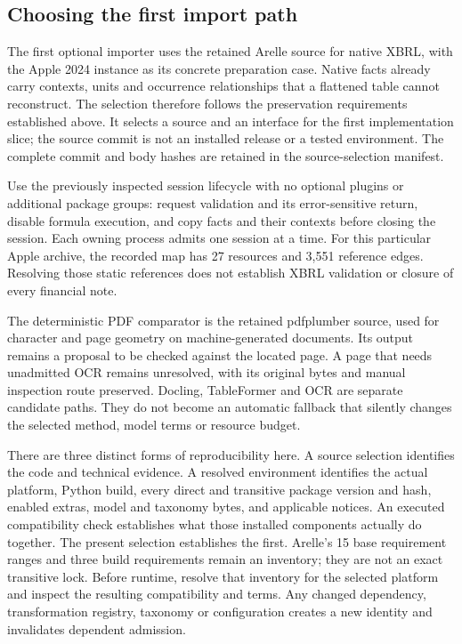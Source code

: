 \hypertarget{choosing-the-first-import-path}{%
\subsection{Choosing the first import path}\label{choosing-the-first-import-path}}

The first optional importer uses the retained Arelle source \mbox{\citep{arellepinned2026}} for native XBRL, with the Apple 2024 instance as its concrete preparation case. Native facts already carry contexts, units and occurrence relationships that a flattened table cannot reconstruct. The selection therefore follows the preservation requirements established above. It selects a source and an interface for the first implementation slice; the source commit is not an installed release or a tested environment. The complete commit and body hashes are retained in the source-selection manifest.

Use the previously inspected session lifecycle with no optional plugins or additional package groups: request validation and its error-sensitive return, disable formula execution, and copy facts and their contexts before closing the session. Each owning process admits one session at a time. For this particular Apple archive, the recorded map has 27 resources and 3,551 reference edges. Resolving those static references does not establish XBRL validation or closure of every financial note.

The deterministic PDF comparator is the retained pdfplumber source, used for character and page geometry on machine-generated documents. Its output remains a proposal to be checked against the located page. A page that needs unadmitted OCR remains unresolved, with its original bytes and manual inspection route preserved. Docling, TableFormer and OCR are separate candidate paths. They do not become an automatic fallback that silently changes the selected method, model terms or resource budget.

There are three distinct forms of reproducibility here. A source selection identifies the code and technical evidence. A resolved environment identifies the actual platform, Python build, every direct and transitive package version and hash, enabled extras, model and taxonomy bytes, and applicable notices. An executed compatibility check establishes what those installed components actually do together. The present selection establishes the first. Arelle's 15 base requirement ranges and three build requirements remain an inventory; they are not an exact transitive lock. Before runtime, resolve that inventory for the selected platform and inspect the resulting compatibility and terms. Any changed dependency, transformation registry, taxonomy or configuration creates a new identity and invalidates dependent admission.

